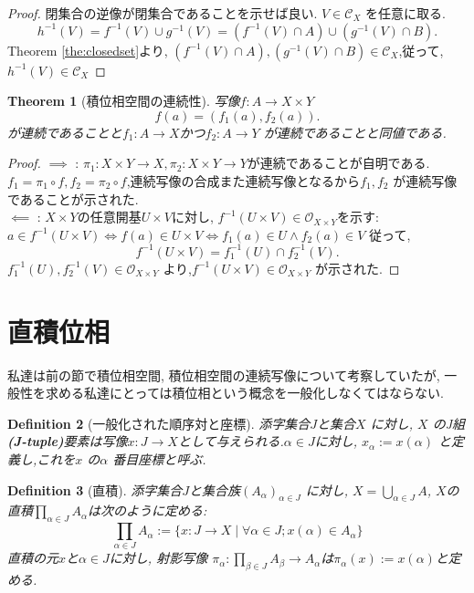 \documentclass[lualatex]{ltjsbook}
\newtheorem{theorem}{Theorem}[section]
\newtheorem{definition}[theorem]{Definition}
\theoremstyle{remark}
\theoremstyle{plain}
\begin{document}
\begin{proof}
	閉集合の逆像が閉集合であることを示せば良い.
	$V\in \mathcal{C}_X$ を任意に取る.
	\[
	h^{-1}(V) =f^{-1}(V) \cup g^{-1}(V) = \left( f^{-1}(V) \cap A \right) \cup \left( g^{-1}(V) \cap B \right) 
	.\] 
	Theorem \ref{the:closedset}より, $\left( f^{-1}(V) \cap A \right),\left( g^{-1}(V) \cap B \right) \in \mathcal{C}_X $,従って,$h^{-1}(V) \in \mathcal{C}_X$
\end{proof}

\begin{theorem}[積位相空間の連続性]
	写像$f:A \to X\times Y$\[
	f(a)=\left( f_1(a),f_2(a) \right) 
	.\] 	
	が連続であることと$f_1 : A\to X$かつ$f_2 : A \to Y$ が連続であることと同値である.
\end{theorem}

\begin{proof}
	$\implies$ : $\pi_1 : X\times Y \to X,\pi_2 : X\times Y \to Y$が連続であることが自明である. $f_1=\pi_1 \circ f, f_2=\pi_2 \circ f $,連続写像の合成また連続写像となるから$f_1,f_2$ が連続写像であることが示された.\\
	$\impliedby$ : $X\times Y$の任意開基$U\times V$に対し, $f^{-1}\left( U\times V \right) \in \mathcal{O}_{X\times Y}$を示す: $a \in f^{-1}(U\times V) \iff f(a) \in U\times V \iff f_1(a) \in U \land f_2(a) \in V$
	従って,
	\[
	f^{-1}(U\times V) = f_1^{-1}(U) \cap f_2^{-1}(V)
	.\] 
	$f_1^{-1}(U),f_2^{-1}(V) \in \mathcal{O}_{X\times Y}$ より,$f^{-1}(U\times V) \in \mathcal{O}_{X\times Y}$ が示された.
\end{proof}

\section{直積位相}%
\label{sec:直積位相}
私達は前の節で積位相空間, 積位相空間の連続写像について考察していたが, 一般性を求める私達にとっては積位相という概念を一般化しなくてはならない.

\begin{definition}[一般化された順序対と座標]
	添字集合$J$と集合$X$ に対し, $X$ のJ組 \textbf{(J-tuple)}要素は写像$x:J\to X$として与えられる.$\alpha \in J$に対し, $x_{\alpha}:=x\left( \alpha \right) $ と定義し,これを$x$ の$\alpha$ 番目座標と呼ぶ.
\end{definition}

\begin{definition}[直積]
	添字集合$J$と集合族$\left( A_{\alpha} \right) _{\alpha \in J}$ に対し,  $X=\bigcup_{\alpha \in J} A$, $X$の直積$\prod_{\alpha \in J}A_{\alpha}$は次のように定める:
	 \[
	\prod_{\alpha \in J}A_{\alpha} :=\{x:J\to X \mid \forall \alpha \in J; x(\alpha) \in A_{\alpha} \} 
	\] 
	直積の元$x$と$\alpha \in J$に対し, 射影写像 $\pi_{\alpha} : \prod_{\beta \in J}A_{\beta} \to A_{\alpha}$は$\pi_{\alpha}(x):= x(\alpha)$と定める.
\end{definition}
\end{document}
